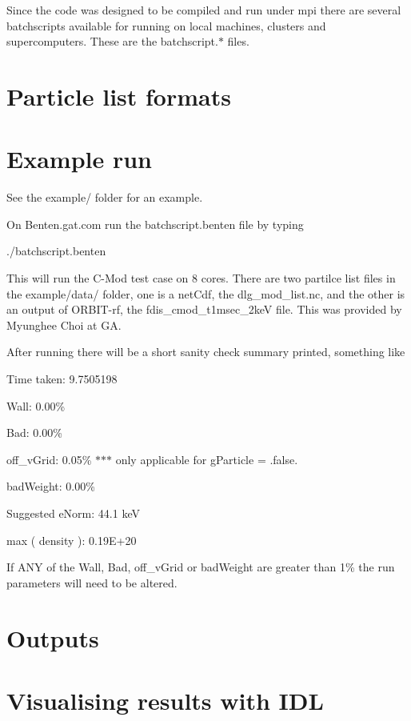 Since the code was designed to be compiled and run under mpi there are several batchscripts available for running on local machines, clusters and supercomputers. These are the batchscript.$\ast$ files.\hypertarget{index_input_formats}{}\section{Particle list formats}\label{index_input_formats}
\hypertarget{index_example_run}{}\section{Example run}\label{index_example_run}
See the example/ folder for an example.

On Benten.gat.com run the batchscript.benten file by typing

./batchscript.benten

This will run the C-Mod test case on 8 cores. There are two partilce list files in the example/data/ folder, one is a netCdf, the dlg\_\-mod\_\-list.nc, and the other is an output of ORBIT-rf, the fdis\_\-cmod\_\-t1msec\_\-2keV file. This was provided by Myunghee Choi at GA.

After running there will be a short sanity check summary printed, something like

Time taken: 9.7505198

Wall: 0.00\%

Bad: 0.00\%

off\_\-vGrid: 0.05\% $\ast$$\ast$$\ast$ only applicable for gParticle = .false.

badWeight: 0.00\%

Suggested eNorm: 44.1 keV

max ( density ): 0.19E+20

If ANY of the Wall, Bad, off\_\-vGrid or badWeight are greater than 1\% the run parameters will need to be altered. \hypertarget{index_output_stuff}{}\section{Outputs}\label{index_output_stuff}
\hypertarget{index_post_proc}{}\section{Visualising results with IDL}\label{index_post_proc}
